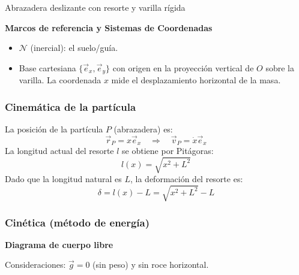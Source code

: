 \begin{solucion}{Abrazadera deslizante con resorte y varilla rígida}

\textbf{Marcos de referencia y Sistemas de Coordenadas}
\begin{itemize}
    \item $\mathcal{N}$ (inercial): el suelo/guía.
    \item Base cartesiana $\{\vec{e}_x, \vec{e}_y\}$ con origen en la proyección vertical de $O$ sobre la varilla. La coordenada $x$ mide el desplazamiento horizontal de la masa.
\end{itemize}

\subsubsection*{Cinemática de la partícula}
La posición de la partícula $P$ (abrazadera) es:
$$\vec{r}_P = x\vec{e}_x \quad\Longrightarrow\quad \vec{v}_P = \dot{x}\vec{e}_x$$
La longitud actual del resorte $l$ se obtiene por Pitágoras:
$$l(x) = \sqrt{x^2 + L^2}$$
Dado que la longitud natural es $L$, la deformación del resorte es:
$$\delta = l(x) - L = \sqrt{x^2 + L^2} - L$$

\subsubsection*{Cinética (método de energía)}
\textbf{Diagrama de cuerpo libre}
\begin{center}
\end{center}
Consideraciones: $\vec{g} = 0$ (sin peso) y sin roce horizontal.


\end{solucion}
